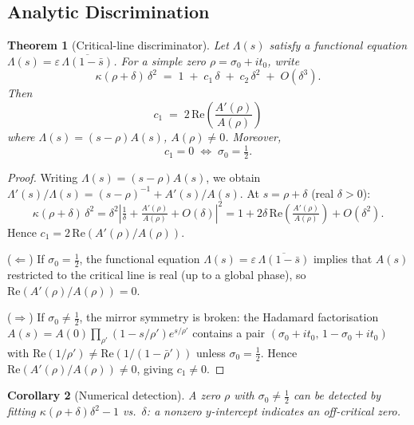 \documentclass[11pt, a4paper]{article}
\theoremstyle{plain}
\newtheorem{theorem}{Theorem}
\newtheorem{corollary}[theorem]{Corollary}
\theoremstyle{definition}
\newcommand{\abs}[1]{\left|#1\right|}
\begin{document}
\subsection{Analytic Discrimination}
\label{ssec:thm7}

\begin{theorem}[Critical-line discriminator]
\label{thm:disc}
  Let $\Lambda(s)$ satisfy a functional equation
  $\Lambda(s)=\varepsilon\,\overline{\Lambda(1-\bar{s})}$.  For a
  simple zero $\rho=\sigma_{0}+it_{0}$, write
  \[
    \kappa(\rho+\delta)\,\delta^{2}
    \;=\; 1 \;+\; c_{1}\,\delta \;+\; c_{2}\,\delta^{2} \;+\; O(\delta^{3}).
  \]
  Then
  \[
    c_{1} \;=\; 2\,\mathrm{Re}\!\left(\frac{A'(\rho)}{A(\rho)}\right)
  \]
  where $\Lambda(s)=(s-\rho)A(s)$, $A(\rho)\neq 0$.
  Moreover,
  \[
    \boxed{c_{1} = 0 \;\iff\; \sigma_{0} = \tfrac{1}{2}.}
  \]
\end{theorem}

\begin{proof}
  Writing $\Lambda(s)=(s-\rho)A(s)$, we obtain
  $\Lambda'(s)/\Lambda(s) = (s-\rho)^{-1}+A'(s)/A(s)$.
  At $s=\rho+\delta$ (real $\delta>0$):
  \[
    \kappa(\rho+\delta)\,\delta^{2}
    = \delta^{2}\abs{\tfrac{1}{\delta} + \tfrac{A'(\rho)}{A(\rho)}+O(\delta)}^{2}
    = 1 + 2\delta\,\mathrm{Re}\!\left(\tfrac{A'(\rho)}{A(\rho)}\right) + O(\delta^{2}).
  \]
  Hence $c_{1}=2\,\mathrm{Re}(A'(\rho)/A(\rho))$.

  \medskip\noindent
  ($\Leftarrow$)  If $\sigma_{0}=\tfrac{1}{2}$, the functional equation
  $\Lambda(s)=\varepsilon\,\overline{\Lambda(1-\bar{s})}$ implies that
  $A(s)$ restricted to the critical line is real (up to a global phase),
  so $\mathrm{Re}(A'(\rho)/A(\rho))=0$.

  \medskip\noindent
  ($\Rightarrow$)  If $\sigma_{0}\neq\tfrac{1}{2}$, the mirror
  symmetry is broken: the Hadamard factorisation
  $A(s)=A(0)\prod_{\rho'}(1-s/\rho')e^{s/\rho'}$ contains a pair
  $(\sigma_{0}+it_{0},\,1-\sigma_{0}+it_{0})$ with
  $\mathrm{Re}(1/\rho')\neq\mathrm{Re}(1/(1-\bar{\rho}'))$ unless
  $\sigma_{0}=\tfrac{1}{2}$.  Hence
  $\mathrm{Re}(A'(\rho)/A(\rho))\neq 0$, giving $c_{1}\neq 0$.
\end{proof}

\begin{corollary}[Numerical detection]
  A zero $\rho$ with $\sigma_{0}\neq\tfrac{1}{2}$ can be detected by
  fitting $\kappa(\rho+\delta)\delta^{2}-1$ vs.\ $\delta$: a nonzero
  $y$-intercept indicates an off-critical zero.
\end{corollary}
\end{document}
